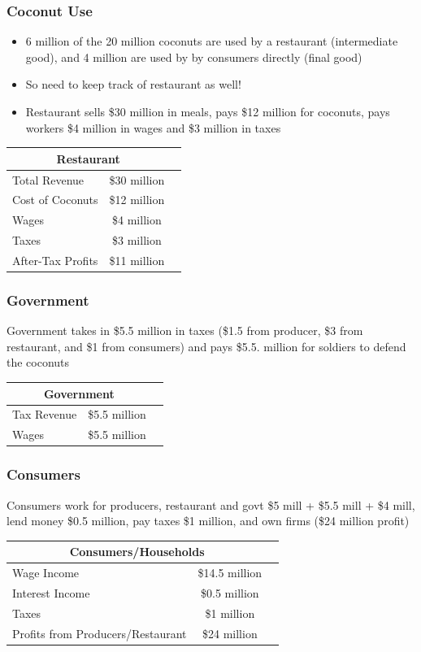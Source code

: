 \documentclass{beamer}
\begin{document}
\begin{frame}
\frametitle[alignment=center]{Coconut Use}
\begin{itemize}
\item 6 million of the 20 million coconuts are used by a restaurant (intermediate good), and 4 million are used by by consumers directly (final good)
\bigskip
\item So need to keep track of restaurant as well!
\bigskip
\item Restaurant sells \$30 million in meals, pays \$12 million for coconuts, pays workers \$4 million in wages and \$3 million in taxes
\end{itemize}
\begin{table}
\begin{tabular}{lcc}
\hline\hline
\multicolumn{2}{c}{Restaurant}\\
\hline
Total Revenue & \$30 million\\
Cost of Coconuts & \$12 million\\
Wages & \$4 million\\
Taxes & \$3 million\\
\hline
After-Tax Profits & \$11 million\\
\hline\hline
\end{tabular}
\end{table}
\end{frame}


\begin{frame}
\frametitle[alignment=center]{Government}
 Government takes in \$5.5 million in taxes (\$1.5 from producer, \$3 from restaurant, and \$1 from consumers) and pays \$5.5. million for soldiers to defend the coconuts
\begin{table}
\begin{tabular}{lcc}
\hline\hline
\multicolumn{2}{c}{Government}\\
\hline
Tax Revenue & \$5.5 million\\
Wages & \$5.5 million\\
\hline\hline
\end{tabular}
\end{table}
\end{frame}


\begin{frame}
\frametitle[alignment=center]{Consumers}
Consumers work for producers, restaurant and govt \$5 mill + \$5.5 mill  + \$4 mill, lend money \$0.5 million, pay taxes \$1 million, and own firms (\$24 million profit)
\begin{table}
\begin{tabular}{lcc}
\hline\hline
\multicolumn{2}{c}{Consumers/Households}\\
\hline
Wage Income & \$14.5 million\\
Interest Income & \$0.5 million\\
Taxes & \$1 million\\
Profits from Producers/Restaurant & \$24 million\\
\hline\hline
\end{tabular}
\end{table}
\end{frame}
\end{document}
